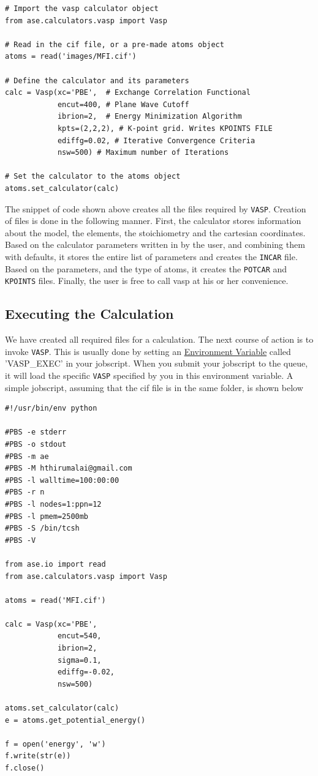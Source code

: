 \documentclass[11pt]{article}
\begin{document}
\begin{verbatim}
# Import the vasp calculator object
from ase.calculators.vasp import Vasp

# Read in the cif file, or a pre-made atoms object
atoms = read('images/MFI.cif')

# Define the calculator and its parameters
calc = Vasp(xc='PBE',  # Exchange Correlation Functional
            encut=400, # Plane Wave Cutoff
            ibrion=2,  # Energy Minimization Algorithm
            kpts=(2,2,2), # K-point grid. Writes KPOINTS FILE
            ediffg=0.02, # Iterative Convergence Criteria
            nsw=500) # Maximum number of Iterations

# Set the calculator to the atoms object
atoms.set_calculator(calc)
\end{verbatim}

The snippet of code shown above creates all the files required by \texttt{VASP}. Creation of files is done in the following manner. First, the calculator stores information about the model, the elements, the stoichiometry and the cartesian coordinates. Based on the calculator parameters written in by the user, and combining them with defaults, it stores the entire list of parameters and creates the \texttt{INCAR} file. Based on the parameters, and the type of atoms, it creates the \texttt{POTCAR} and \texttt{KPOINTS} files. Finally, the user is free to call vasp at his or her convenience. 

\subsection{Executing the Calculation}
\label{sec-4-3}
We have created all required files for a calculation. The next course of action is to invoke \texttt{VASP}. This is usually done by setting an \href{https://en.wikipedia.org/wiki/Environment_variable}{Environment Variable} called 'VASP\_EXEC' in your jobscript. When you submit your jobscript to the queue, it will load the specific \texttt{VASP} specified by you in this environment variable. A simple jobscript, assuming that the cif file is in the same folder, is shown below

\begin{verbatim}
#!/usr/bin/env python

#PBS -e stderr
#PBS -o stdout
#PBS -m ae
#PBS -M hthirumalai@gmail.com
#PBS -l walltime=100:00:00
#PBS -r n
#PBS -l nodes=1:ppn=12
#PBS -l pmem=2500mb
#PBS -S /bin/tcsh
#PBS -V

from ase.io import read
from ase.calculators.vasp import Vasp

atoms = read('MFI.cif')

calc = Vasp(xc='PBE',
            encut=540,
            ibrion=2,
            sigma=0.1,
            ediffg=-0.02,
            nsw=500)

atoms.set_calculator(calc)
e = atoms.get_potential_energy()

f = open('energy', 'w')
f.write(str(e))
f.close()
\end{verbatim}
\end{document}
